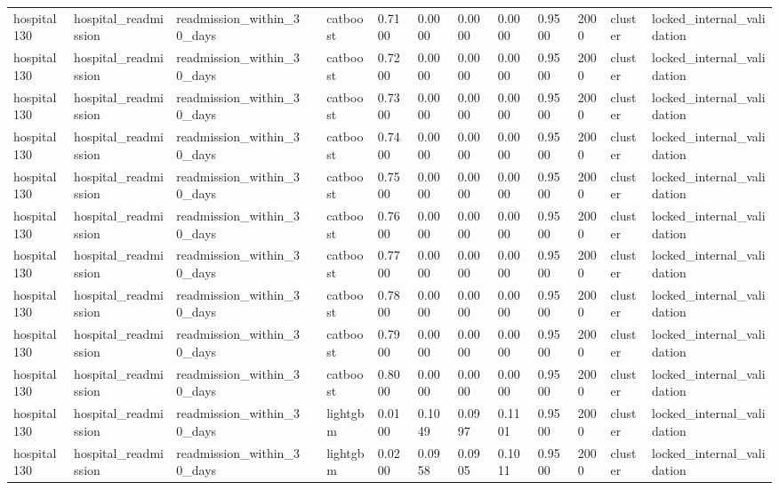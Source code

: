 \begin{tabular}{lllllllllllll}
hospital130 & hospital\_readmission & readmission\_within\_30\_days &  & catboost & 0.7100 & 0.0000 & 0.0000 & 0.0000 & 0.9500 & 2000 & cluster & locked\_internal\_validation \\
hospital130 & hospital\_readmission & readmission\_within\_30\_days &  & catboost & 0.7200 & 0.0000 & 0.0000 & 0.0000 & 0.9500 & 2000 & cluster & locked\_internal\_validation \\
hospital130 & hospital\_readmission & readmission\_within\_30\_days &  & catboost & 0.7300 & 0.0000 & 0.0000 & 0.0000 & 0.9500 & 2000 & cluster & locked\_internal\_validation \\
hospital130 & hospital\_readmission & readmission\_within\_30\_days &  & catboost & 0.7400 & 0.0000 & 0.0000 & 0.0000 & 0.9500 & 2000 & cluster & locked\_internal\_validation \\
hospital130 & hospital\_readmission & readmission\_within\_30\_days &  & catboost & 0.7500 & 0.0000 & 0.0000 & 0.0000 & 0.9500 & 2000 & cluster & locked\_internal\_validation \\
hospital130 & hospital\_readmission & readmission\_within\_30\_days &  & catboost & 0.7600 & 0.0000 & 0.0000 & 0.0000 & 0.9500 & 2000 & cluster & locked\_internal\_validation \\
hospital130 & hospital\_readmission & readmission\_within\_30\_days &  & catboost & 0.7700 & 0.0000 & 0.0000 & 0.0000 & 0.9500 & 2000 & cluster & locked\_internal\_validation \\
hospital130 & hospital\_readmission & readmission\_within\_30\_days &  & catboost & 0.7800 & 0.0000 & 0.0000 & 0.0000 & 0.9500 & 2000 & cluster & locked\_internal\_validation \\
hospital130 & hospital\_readmission & readmission\_within\_30\_days &  & catboost & 0.7900 & 0.0000 & 0.0000 & 0.0000 & 0.9500 & 2000 & cluster & locked\_internal\_validation \\
hospital130 & hospital\_readmission & readmission\_within\_30\_days &  & catboost & 0.8000 & 0.0000 & 0.0000 & 0.0000 & 0.9500 & 2000 & cluster & locked\_internal\_validation \\
hospital130 & hospital\_readmission & readmission\_within\_30\_days &  & lightgbm & 0.0100 & 0.1049 & 0.0997 & 0.1101 & 0.9500 & 2000 & cluster & locked\_internal\_validation \\
hospital130 & hospital\_readmission & readmission\_within\_30\_days &  & lightgbm & 0.0200 & 0.0958 & 0.0905 & 0.1011 & 0.9500 & 2000 & cluster & locked\_internal\_validation \\

\end{tabular}
